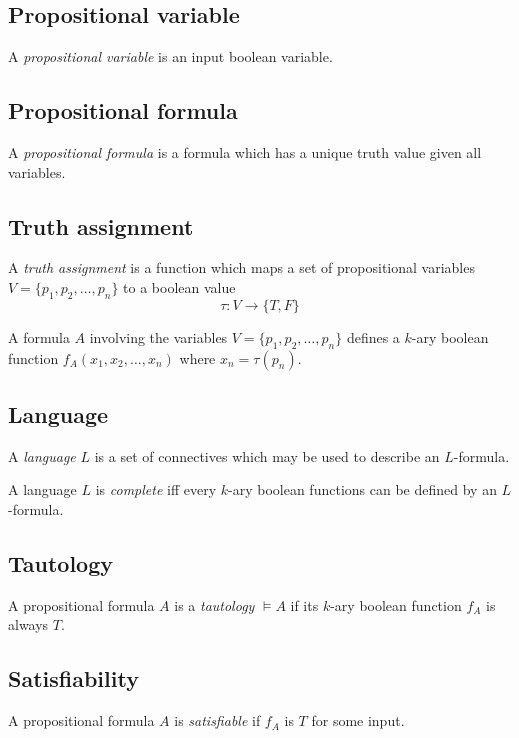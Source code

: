 \documentclass[a4paper]{article}
\begin{document}
\subsection{Propositional variable}

A \textit{propositional variable} is an input boolean variable.

\subsection{Propositional formula}

A \textit{propositional formula} is a formula which has a unique truth value given all variables.

\subsection{Truth assignment}

A \textit{truth assignment} is a function which maps a set of propositional
variables \(V=\{p_1, p_2, \ldots, p_n\}\) to a boolean value
\[
    \tau: V \to \{T,F\}
\]

A formula \(A\) involving the variables \(V=\{p_1, p_2, \ldots, p_n\}\)
defines a \(k\)-ary boolean function \(f_A(x_1, x_2, \ldots, x_n)\) where \(x_n = \tau(p_n)\).

\subsection{Language}

A \textit{language} \(L\) is a set of connectives which may be used to describe
an \(L\)-formula.

A language \(L\) is \textit{complete} iff every \(k\)-ary boolean functions can be
defined by an \(L\)-formula.

\subsection{Tautology}

A propositional formula \(A\) is a \textit{tautology} \(\vDash A\) if its \(k\)-ary boolean
function \(f_A\) is always \(T\).

\subsection{Satisfiability}

A propositional formula \(A\) is \textit{satisfiable}
if \(f_A\) is \(T\) for some input.
\end{document}
